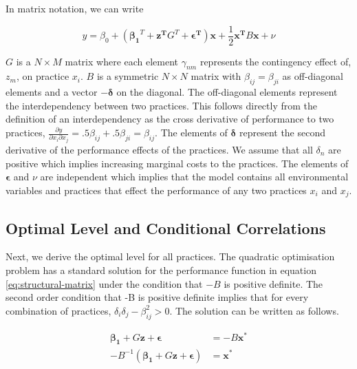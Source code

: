 \documentclass[12pt]{article}
\begin{document}
 
In matrix notation, we can write
 
\begin{equation} \label{eq:structural-matrix}
y = \beta_0 + (\mathbf{\beta_1}^T + \mathbf{z^T} G^T + \mathbf{\epsilon^T})
     \mathbf{x} + \frac{1}{2}\mathbf{x^T} B \mathbf{x} + \nu
\end{equation}

$G$ is a $N \times M$ matrix where each element $\gamma_{nm}$ represents the contingency effect of, $z_m$, on practice $x_i$. $B$ is a symmetric $N \times N$ matrix with $\beta_{ij} = \beta_{ji}$ as off-diagonal elements and a vector $-\mathbf{\delta}$ on the diagonal. The off-diagonal elements represent the interdependency between two practices. This follows directly from the definition of an interdependency as the cross derivative of performance to two practices, $\frac{\partial y}{\partial x_i \partial x_j} = .5 \beta_{ij} + .5 \beta_{ji} = \beta_{ij}$. The elements of $\mathbf{\delta}$ represent the second derivative of the performance effects of the practices. We assume that all $\delta_n$ are positive which implies increasing marginal costs to the practices. The elements of $\mathbf{\epsilon}$ and $\nu$ are independent which implies that the model contains all environmental variables and practices that effect the performance of any two practices $x_i$ and $x_j$. 
 
\subsection{Optimal Level and Conditional Correlations}

Next, we derive the optimal level for all practices. The quadratic optimisation problem has a standard solution for the performance function in equation \eqref{eq:structural-matrix} under the condition that $-B$ is positive definite. The second order condition that -B is positive definite implies that for every combination of practices, $\delta_i \delta_j - \beta_{ij}^2 > 0$. The solution can be written as follows.
 
\begin{equation} \label{eq:optimal-matrix}
\begin{aligned} 
    \mathbf{\beta_1} + G \mathbf{z} + \mathbf{\epsilon} & = -B \mathbf{x^*} \\
    - B^{-1} (\mathbf{\beta_1} +  G \mathbf{z} + \mathbf{\epsilon})  & = \mathbf{x^*}
\end{aligned}
\end{equation}
 
\end{document}
